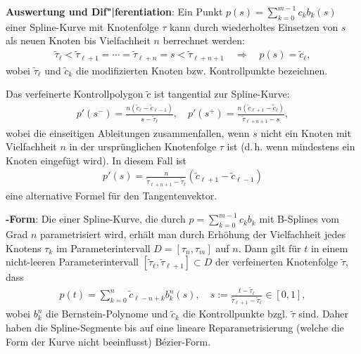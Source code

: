 \textbf{Auswertung und Dif"|ferentiation}:
Ein Punkt $p(s) = \sum_{k=0}^{m-1} c_k b_k(s)$ einer Spline-Kurve mit Knotenfolge $\tau$ kann
durch wiederholtes Einsetzen von $s$ als neuen Knoten bis Vielfachheit $n$ berrechnet werden:
\begin{align*}
    \widetilde{\tau}_\ell < \widetilde{\tau}_{\ell+1} = \dotsb = \widetilde{\tau}_{\ell+n} = s <
    \widetilde{\tau}_{\ell+n+1} \quad\Rightarrow\quad p(s) = \widetilde{c}_\ell,
\end{align*}
wobei $\widetilde{\tau}_\ell$ und $\widetilde{c}_k$ die modifizierten Knoten bzw. Kontrollpunkte
bezeichnen.

Das verfeinerte Kontrollpolygon $\widetilde{c}$ ist tangential zur Spline-Kurve:
\begin{align*}
    p'(s^-) = \frac{n (\widetilde{c}_\ell - \widetilde{c}_{\ell-1})}
    {s - \widetilde{\tau}_\ell},\quad
    p'(s^+) = \frac{n (\widetilde{c}_{\ell+1} - \widetilde{c}_\ell)}
    {\widetilde{\tau}_{\ell+n+1} - s},
\end{align*}
wobei die einseitigen Ableitungen zusammenfallen, wenn $s$ nicht ein Knoten mit Vielfachheit $n$
in der ursprünglichen Knotenfolge $\tau$ ist (d.\,h. wenn mindestens ein Knoten eingefügt wird).
In diesem Fall ist
\begin{align*}
    p'(s) = \frac{n}{\widetilde{\tau}_{\ell+n+1} - \widetilde{\tau}_\ell}
    (\widetilde{c}_{\ell+1} - \widetilde{c}_{\ell-1})
\end{align*}
eine alternative Formel für den Tangentenvektor.

\linie

\textbf{-Form}:
Die  einer Spline-Kurve, die durch
$p = \sum_{k=0}^{m-1} c_k b_k$ mit B-Splines vom Grad $n$ parametrisiert wird,
erhält man durch Erhöhung der Vielfachheit jedes Knotens $\tau_k$ im Parameterintervall
$D = [\tau_n, \tau_m]$ auf $n$.
Dann gilt für $t$ in einem nicht-leeren Parameterintervall
$[\widetilde{\tau}_\ell, \widetilde{\tau}_{\ell+1}] \subset D$
der verfeinerten Knotenfolge $\widetilde{\tau}$, dass
\begin{align*}
    p(t) = \sum_{k=0}^n \widetilde{c}_{\ell-n+k} b_k^n(s),\quad
    s := \frac{t - \widetilde{\tau}_\ell}
    {\widetilde{\tau}_{\ell+1} - \widetilde{\tau}_\ell} \in [0, 1],
\end{align*}
wobei $b_k^n$ die Bernstein-Polynome und $\widetilde{c}_k$ die Kontrollpunkte bzgl.
$\widetilde{\tau}$ sind.
Daher haben die Spline-Segmente bis auf eine lineare Reparametrisierung
(welche die Form der Kurve nicht beeinflusst) Bézier-Form.

